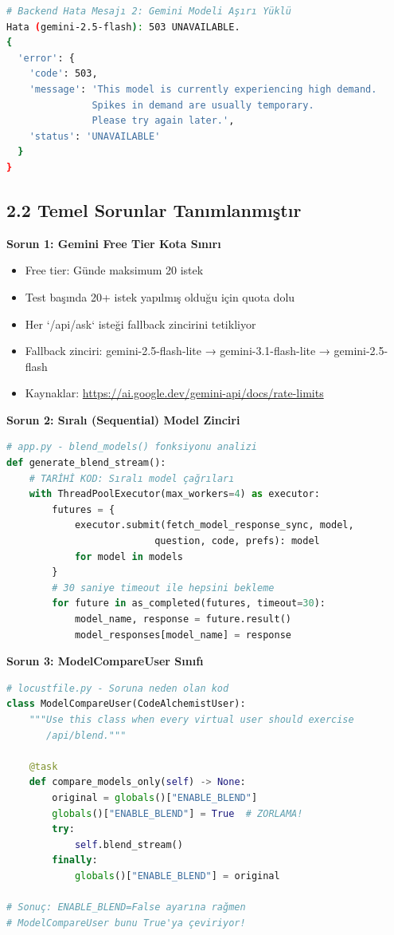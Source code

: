 \documentclass[12pt,a4paper]{report}
\begin{document}
\begin{lstlisting}[language=bash]
# Backend Hata Mesajı 2: Gemini Modeli Aşırı Yüklü
Hata (gemini-2.5-flash): 503 UNAVAILABLE.
{
  'error': {
    'code': 503,
    'message': 'This model is currently experiencing high demand. 
               Spikes in demand are usually temporary. 
               Please try again later.',
    'status': 'UNAVAILABLE'
  }
}
\end{lstlisting}

\subsection{2.2 Temel Sorunlar Tanımlanmıştır}

\textbf{Sorun 1: Gemini Free Tier Kota Sınırı}
\begin{itemize}
    \item Free tier: Günde maksimum 20 istek
    \item Test başında 20+ istek yapılmış olduğu için quota dolu
    \item Her `/api/ask` isteği fallback zincirini tetikliyor
    \item Fallback zinciri: gemini-2.5-flash-lite → gemini-3.1-flash-lite → gemini-2.5-flash
    \item Kaynaklar: \url{https://ai.google.dev/gemini-api/docs/rate-limits}
\end{itemize}

\textbf{Sorun 2: Sıralı (Sequential) Model Zinciri}
\begin{lstlisting}[language=Python]
# app.py - blend_models() fonksiyonu analizi
def generate_blend_stream():
    # TARİHİ KOD: Sıralı model çağrıları
    with ThreadPoolExecutor(max_workers=4) as executor:
        futures = {
            executor.submit(fetch_model_response_sync, model, 
                          question, code, prefs): model 
            for model in models
        }
        # 30 saniye timeout ile hepsini bekleme
        for future in as_completed(futures, timeout=30):
            model_name, response = future.result()
            model_responses[model_name] = response
\end{lstlisting}

\textbf{Sorun 3: ModelCompareUser Sınıfı}
\begin{lstlisting}[language=Python]
# locustfile.py - Soruna neden olan kod
class ModelCompareUser(CodeAlchemistUser):
    """Use this class when every virtual user should exercise 
       /api/blend."""
    
    @task
    def compare_models_only(self) -> None:
        original = globals()["ENABLE_BLEND"]
        globals()["ENABLE_BLEND"] = True  # ZORLAMA!
        try:
            self.blend_stream()
        finally:
            globals()["ENABLE_BLEND"] = original

# Sonuç: ENABLE_BLEND=False ayarına rağmen 
# ModelCompareUser bunu True'ya çeviriyor!
\end{lstlisting}
\end{document}
